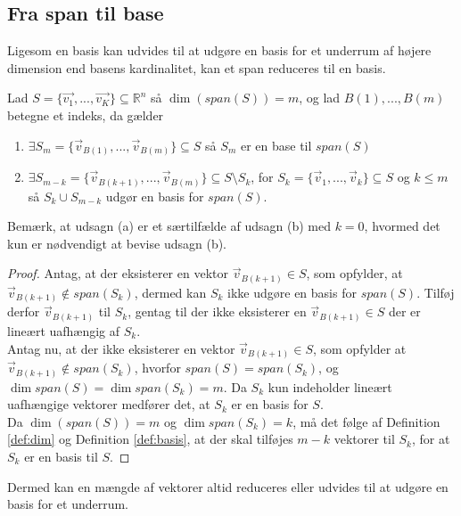 \subsection{Fra span til base}
Ligesom en basis kan udvides til at udgøre en basis for et underrum af højere dimension end basens kardinalitet, kan et span reduceres til en basis.
\begin{stn}
Lad $S=\{\vec{v_1},..., \vec{v_K}\} \subseteq \mathds{R}^n$ så $\dim(span(S)) = m$, og lad $B(1),...,B(m)$ betegne et indeks, da gælder
\begin{enumerate}[label=\alph*]
\item $\exists S_m =\{\vec{v}_{B(1)},...,\vec{v}_{B(m)}\}\subseteq S$ så $S_m$ er en base til $span (S)$
\item $\exists S_{m-k} = \{\vec{v}_{B(k+1)},...,\vec{v}_{B(m)}\} \subseteq S\setminus S_k$, for $S_k = \{\vec{v}_{1},..., \vec{v}_k\} \subseteq S$ og $k \leq m$ så $S_k \cup S_{m-k}$ udgør en basis for $span(S)$.
\end{enumerate} 
\label{stn:spantilbasis}
\end{stn}
Bemærk, at udsagn (a) er et særtilfælde af udsagn (b) med $k=0$, hvormed det kun er nødvendigt at bevise udsagn (b).
\begin{proof}
Antag, at der eksisterer en vektor $\vec{v}_{B(k+1)} \in S$, som opfylder, at $\vec{v}_{B(k+1)} \notin span(S_k)$, dermed kan $S_k$ ikke udgøre en basis for $span(S)$. 
Tilføj derfor $\vec{v}_{B(k+1)}$ til $S_k$, gentag til der ikke eksisterer en $\vec{v}_{B(k+1)} \in S$ der er lineært uafhængig af $S_k$. 
\\Antag nu, at der ikke eksisterer en vektor $\vec{v}_{B(k+1)} \in S$, som opfylder at $\vec{v}_{B(k+1)} \notin span(S_k)$, hvorfor $span(S) = span(S_k)$, og $\dim{span(S)}=\dim{span(S_k)}= m$.
Da $S_k$ kun indeholder lineært uafhængige vektorer medfører det, at $S_k$ er en basis for $S$.
\\Da $\dim(span(S)) = m$ og $\dim{span(S_k)}=k$, må det følge af Definition \ref{def:dim} og Definition \ref{def:basis}, at der skal tilføjes $m-k$ vektorer til $S_k$, for at $S_k$ er en basis til $S$.
\end{proof} 
Dermed kan en mængde af vektorer altid reduceres eller udvides til at udgøre en basis for et underrum.


